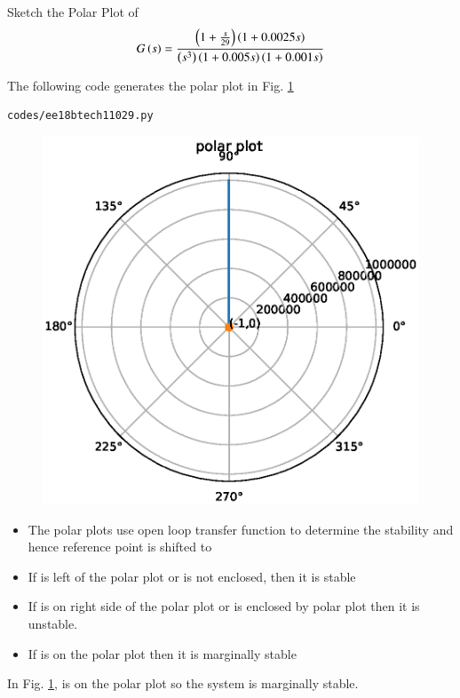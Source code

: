 \item
Sketch the Polar Plot of
\begin{align}
G\left(s\right) = \frac{\left(1+\frac{s}{29}\right)\left(1+0.0025s\right)}{\left(s^{3}\right)\left(1+0.005s\right)\left(1+0.001s\right)}
\end{align}

\solution 
%
The following code generates the polar plot in Fig.   \ref{fig:ee18btech11029}

\begin{lstlisting}
codes/ee18btech11029.py
\end{lstlisting}

\begin{figure}[!h]
\centering
  \includegraphics[width=\columnwidth]{./figs/ee18btech11029.eps}
  \caption{}
  \label{fig:ee18btech11029}
\end{figure}

\begin{itemize}
    \item The polar plots use open loop transfer function to determine the stability and hence reference point is shifted to 
    \item If  is left of the polar plot or  is not enclosed, then it is stable
    \item If  is on right side of the polar plot or  is enclosed by polar plot then it is unstable. 
    \item If  is on the polar plot then it is marginally stable
    
\end{itemize}

In Fig.   \ref{fig:ee18btech11029},   is on the polar plot so the system is marginally stable.
   
